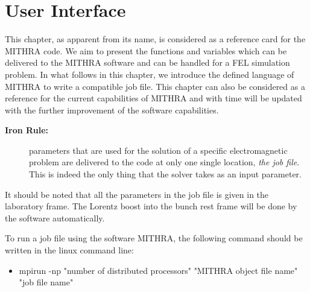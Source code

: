 \chapter{User Interface}
\label{chapter_ui}

This chapter, as apparent from its name, is considered as a reference card for the MITHRA code.
%
We aim to present the functions and variables which can be delivered to the MITHRA software and can be handled for a FEL simulation problem.
%
In what follows in this chapter, we introduce the defined language of MITHRA to write a compatible job file.
%
This chapter can also be considered as a reference for the current capabilities of MITHRA and with time will be updated with the further improvement of the software capabilities.
%
\begin{description}
\item[\textbf{Iron Rule:}] parameters that are used for the solution of a specific electromagnetic problem are delivered to the code at only one single location, \emph{the job file}. This is indeed the only thing that the solver takes as an input parameter.
\end{description}
%
It should be noted that all the parameters in the job file is given in the laboratory frame.
%
The Lorentz boost into the bunch rest frame will be done by the software automatically.

To run a job file using the software MITHRA, the following command should be written in the linux command line:

\begin{itemize}
	\item  mpirun -np "number of distributed processors" "MITHRA object file name" "job file name"
\end{itemize}

